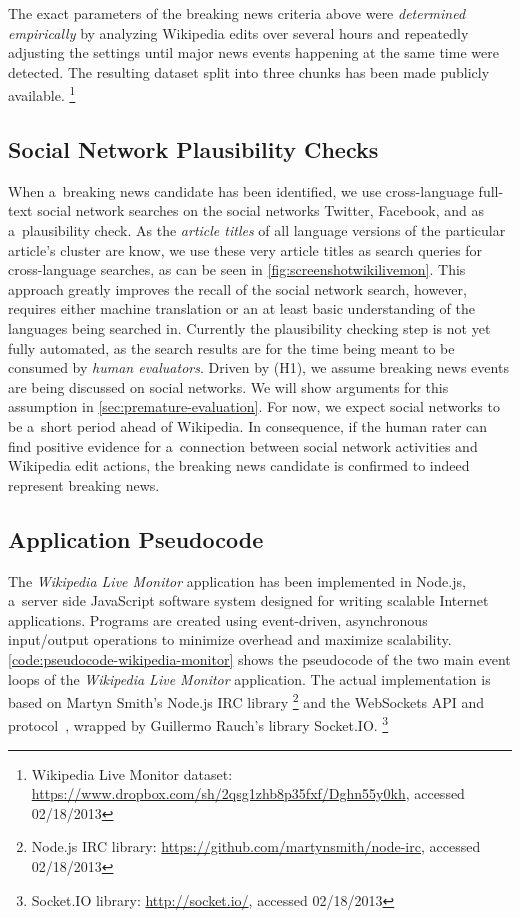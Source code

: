 The exact parameters of the breaking news criteria above
were \emph{determined empirically} by analyzing Wikipedia edits
over several hours and repeatedly adjusting the settings until
major news events happening at the same time were detected.
The resulting dataset split into three chunks has been made publicly available.%
\footnote{Wikipedia Live Monitor dataset: \url{https://www.dropbox.com/sh/2qsg1zhb8p35fxf/Dghn55y0kh},
accessed 02/18/2013}

\subsection{Social Network Plausibility Checks}

When a~breaking news candidate has been identified,
we use cross-language full-text social network searches 
on the social networks Twitter, Facebook, and \googleplus
as a~plausibility check.
As the \emph{article titles} of all language versions
of the particular article's cluster are know,
we use these very article titles as search queries for cross-language searches,
as can be seen in \autoref{fig:screenshotwikilivemon}.
This approach greatly improves the recall of the social network search,
however, requires either machine translation or an at least basic understanding
of the languages being searched in.
Currently the plausibility checking step is not yet fully automated,
as the search results are for the time being meant to be consumed by \emph{human evaluators}.
Driven by (H1), we assume breaking news events are being discussed on social networks.
We will show arguments for this assumption in \autoref{sec:premature-evaluation}.
For now, we expect social networks to be a~short period ahead of Wikipedia.
In consequence, if the human rater can find positive evidence
for a~connection between social network activities and Wikipedia edit actions,
the breaking news candidate is confirmed to indeed represent breaking news.

\subsection{Application Pseudocode}

The \emph{Wikipedia Live Monitor} application has been implemented in Node.js,
a~server side JavaScript software system
designed for writing scalable Internet applications.
Programs are created using event-driven, asynchronous input/output operations
to minimize overhead and maximize scalability.
\autoref{code:pseudocode-wikipedia-monitor} shows the pseudocode of the two main event loops of the
\emph{Wikipedia Live Monitor} application.
The actual implementation is based on 
Martyn Smith's Node.js IRC library%
\footnote{Node.js IRC library: \url{https://github.com/martynsmith/node-irc},
accessed 02/18/2013} and
the WebSockets API and protocol~\cite{hickson2012websockets},
wrapped by  Guillermo Rauch's library Socket.IO.%
\footnote{Socket.IO library: \url{http://socket.io/},
accessed 02/18/2013}


